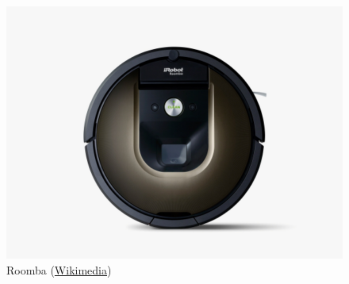 \begin{figure}[!h]
	\centering
	\includegraphics[scale=0.1]{./EtapaModerna/Imagenes/roomba.jpg}
	\caption{Roomba (\href{https://commons.wikimedia.org/wiki/File:IRobot\_Roomba\_980.jpg}{Wikimedia})}
	\label{fig:roomba}
\end{figure}
